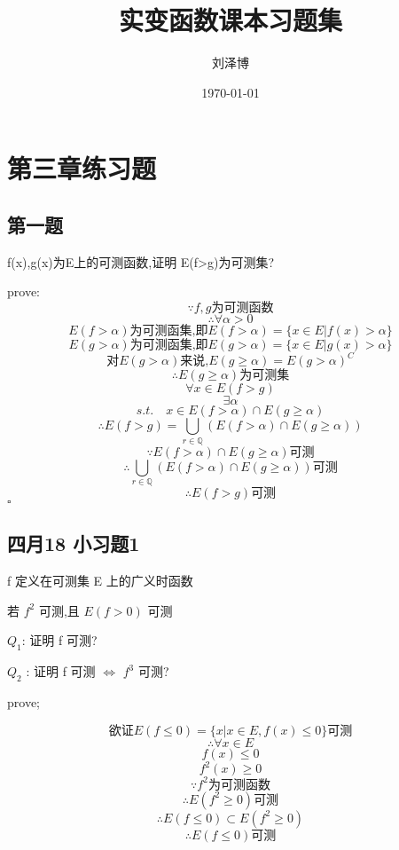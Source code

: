 \documentclass[a4paper]{article}
\title{实变函数课本习题集}
\author{刘泽博}
\date{\today}
\begin{document}
    \maketitle
    \tableofcontents
    \section{第三章练习题}    
    \subsection{第一题}

    f(x),g(x)为E上的可测函数,证明 E(f>g)为可测集?

    prove:
    \[\because f,g\text{为可测函数}\]
    \[\therefore \forall \alpha >0\]
    \[E(f>\alpha)\text{为可测函集,即}E(f>\alpha)=\{x\in E | f(x)>\alpha\}\]
    \[E(g>\alpha)\text{为可测函集,即}E(g>\alpha)=\{x\in E | g(x)>\alpha\}\]
    \[\text{对}E(g>\alpha)\text{来说,}E(g\ge\alpha)=E(g>\alpha)^C\]
    \[\therefore E(g\ge\alpha)\text{为可测集}\]
    \[\forall x \in E(f>g)\]
    \[\exists \alpha\]
    \[s.t. \quad x\in E(f>\alpha) \cap E(g \ge \alpha)\]
    \[\therefore E(f>g)=\bigcup_{r\in \mathbb{Q}}(E(f>\alpha)\cap E(g\ge \alpha))\]
    \[\because E(f>\alpha)\cap E(g\ge\alpha)\text{可测}\]
    \[\therefore \bigcup_{r\in \mathbb{Q}}(E(f>\alpha)\cap E(g\ge \alpha))\text{可测}\]
    \[\therefore E(f>g)\text{可测}\]
    \hfill $\square$

    \subsection{四月18 小习题1}
    
    f 定义在可测集 E 上的广义时函数

    若 $f^2$ 可测,且 $E(f>0)$ 可测

    $Q_1$: 证明 f 可测?

    $Q_2$ : 证明 f 可测 $\Leftrightarrow$ $f^3$ 可测?

    prove;

    \[\text{欲证} E(f \le 0)=\{x|x\in E,f(x) \le 0\}\text{可测}\]
    \[\therefore \forall x \in E\]
    \[f(x)\le 0\]
    \[f^2(x)\ge 0\]
    \[\because f^2 \text{为可测函数}\]
    \[\therefore E(f^2\ge 0)\text{可测}\]
    \[\therefore E(f\le 0)\subset E(f^2\ge 0)\]
    \[\therefore E(f\le 0)\text{可测}\]

    
\end{document}
